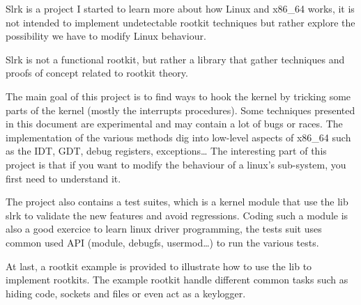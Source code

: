 Slrk is a project I started to learn more about how Linux and x86\_64 works,
it is not intended to implement undetectable rootkit techniques but rather
explore the possibility we have to modify Linux behaviour.

Slrk is not a functional rootkit, but rather a library that gather techniques
and proofs of concept related to rootkit theory.

The main goal of this project is to find ways to hook the kernel by tricking
some parts of the kernel (mostly the interrupts procedures).
Some techniques presented in this document are experimental and may contain
a lot of bugs or races.
The implementation of the various methods dig into low-level aspects of
x86\_64 such as the IDT, GDT, debug registers, exceptions…
The interesting part of this project is that if you want to modify the
behaviour of a linux's sub-system, you first need to understand it.

The project also contains a test suites, which is a kernel module that use
the lib slrk to validate the new features and avoid regressions.
Coding such a module is also a good exercice to learn linux driver programming,
the tests suit uses common used API (module, debugfs, usermod…) to run the
various tests.

At last, a rootkit example is provided to illustrate how to use the lib to
implement rootkits. The example rootkit handle different common tasks such
as hiding code, sockets and files or even act as a keylogger.
